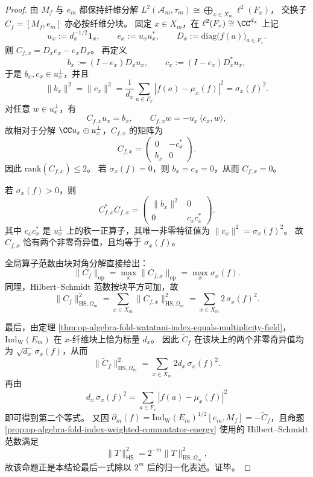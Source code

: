 \begin{proof}
由 \(M_f\) 与 \(e_m\) 都保持纤维分解
\(
L^2(\mathcal A_m,\tau_m)\cong \bigoplus_{x\in X_m}\ell^2(F_x)
\)，
交换子 \(C_f=[M_f,e_m]\) 亦必按纤维分块。
固定 \(x\in X_m\)，在 \(\ell^2(F_x)\cong \CC^{d_x}\) 上记
\[
u_x:=d_x^{-1/2}\mathbf 1_x,
\qquad
e_x:=u_xu_x^\ast,
\qquad
D_x:=\mathrm{diag}\bigl(f(a)\bigr)_{a\in F_x}.
\]
则 \(C_{f,x}=D_xe_x-e_xD_x\)。
再定义
\[
b_x:=(I-e_x)D_xu_x,
\qquad
c_x:=(I-e_x)D_x^\ast u_x,
\]
于是 \(b_x,c_x\in u_x^\perp\)，并且
\[
\|b_x\|^2
=
\|c_x\|^2
=
\frac1{d_x}\sum_{a\in F_x}|f(a)-\mu_x(f)|^2
=
\sigma_x(f)^2.
\]
对任意 \(w\in u_x^\perp\)，有
\[
C_{f,x}u_x=b_x,
\qquad
C_{f,x}w=-u_x\,\langle c_x,w\rangle,
\]
故相对于分解 \(\CC u_x\oplus u_x^\perp\)，\(C_{f,x}\) 的矩阵为
\[
C_{f,x}=
\begin{pmatrix}
0 & -c_x^\ast\\
b_x & 0
\end{pmatrix}.
\]
因此 \(\mathrm{rank}(C_{f,x})\le 2\)。
若 \(\sigma_x(f)=0\)，则 \(b_x=c_x=0\)，从而 \(C_{f,x}=0\)。

若 \(\sigma_x(f)>0\)，则
\[
C_{f,x}^\ast C_{f,x}
=
\begin{pmatrix}
\|b_x\|^2 & 0\\
0 & c_xc_x^\ast
\end{pmatrix}.
\]
其中 \(c_xc_x^\ast\) 是 \(u_x^\perp\) 上的秩一正算子，其唯一非零特征值为 \(\|c_x\|^2=\sigma_x(f)^2\)。
故 \(C_{f,x}\) 恰有两个非零奇异值，且均等于 \(\sigma_x(f)\)。

全局算子范数由块对角分解直接给出：
\[
\|C_f\|_{\mathrm{op}}=\max_x \|C_{f,x}\|_{\mathrm{op}}=\max_x \sigma_x(f).
\]
同理，Hilbert--Schmidt 范数按块平方可加，故
\[
\|C_f\|_{\mathrm{HS},\Omega_m}^2
=
\sum_{x\in X_m}\|C_{f,x}\|_{\mathrm{HS},\Omega_m}^2
=
\sum_{x\in X_m}2\,\sigma_x(f)^2.
\]

最后，由定理 \ref{thm:op-algebra-fold-watatani-index-equals-multiplicity-field}，
\(\mathrm{Ind}_{\mathrm W}(E_m)\) 在 \(x\)-纤维块上恰为标量 \(d_x\)。
因此 \(\widetilde C_f\) 在该块上的两个非零奇异值均为 \(\sqrt{d_x}\,\sigma_x(f)\)，从而
\[
\|\widetilde C_f\|_{\mathrm{HS},\Omega_m}^2
=
\sum_{x\in X_m}2d_x\,\sigma_x(f)^2.
\]
再由
\[
d_x\,\sigma_x(f)^2
=
\sum_{a\in F_x}|f(a)-\mu_x(f)|^2
\]
即可得到第二个等式。
又因 \(\partial_m(f)=\mathrm{Ind}_{\mathrm W}(E_m)^{1/2}[e_m,M_f]=-\widetilde C_f\)，且命题 \ref{prop:op-algebra-fold-index-weighted-commutator-energy} 使用的 Hilbert--Schmidt 范数满足
\[
\|T\|_{\mathsf{HS}}^2=2^{-m}\|T\|_{\mathrm{HS},\Omega_m}^2,
\]
故该命题正是本结论最后一式除以 \(2^m\) 后的归一化表述。证毕。
\end{proof}

\endinput
